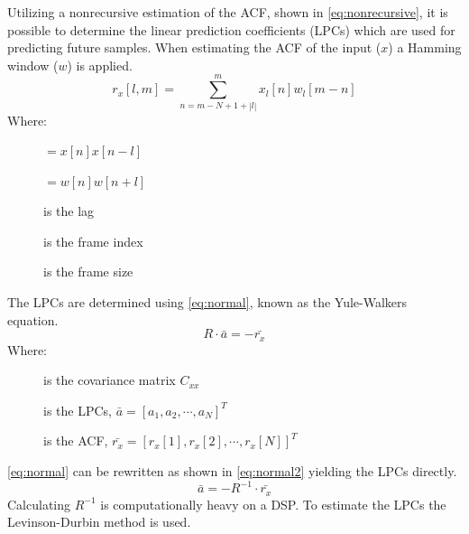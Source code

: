 Utilizing a nonrecursive estimation of the ACF, shown in \autoref{eq:nonrecursive}, it is possible to determine the linear prediction coefficients (LPCs) which are used for predicting future samples. When estimating the ACF of the input ($x$) a Hamming window ($w$) is applied.
\begin{equation}\label{eq:nonrecursive}
r_x[l,m] = \sum^{m}_{n=m-N+1+\left| l\right|} x_l[n]w_l[m-n]
\end{equation}
Where:
\vspace{-8mm}
\begin{description}
	\item[] $=x[n]x[n-l]$ 
	\item[] $=w[n]w[n+l]$
	\item[] is the lag 
	\item[] is the frame index
	\item[] is the frame size
\end{description}
The LPCs are determined using \autoref{eq:normal}, known as the Yule-Walkers equation.
\begin{equation}\label{eq:normal}
R \cdot \bar{a} = -\bar{r_x}
\end{equation}
Where:
\vspace{-8mm} %
\begin{description}
	\item[] is the covariance matrix $C_{xx}$
	\item[] is the LPCs, $\bar{a} = [a_1 , a_2, \cdots, a_N]^T$
	\item[] is the ACF, $\bar{r_x} = [r_x[1] , r_x[2], \cdots, r_x[N]]^T$
\end{description}
\autoref{eq:normal} can be rewritten as shown in \autoref{eq:normal2} yielding the LPCs directly.  
 \begin{equation}\label{eq:normal2}
\bar{a} = -R^{-1}\cdot \bar{r_x}
\end{equation}
Calculating $R^{-1}$ is computationally heavy on a DSP. To estimate the LPCs the Levinson-Durbin method is used.



